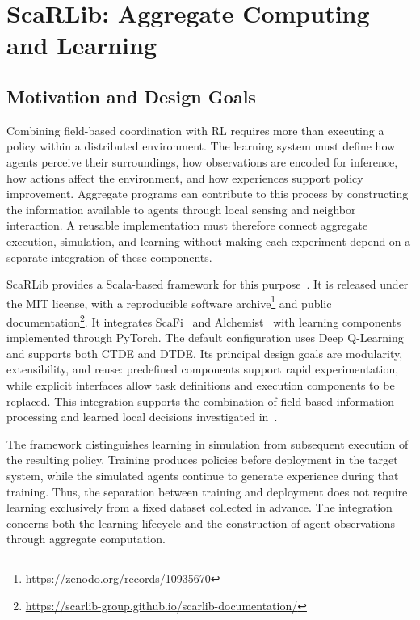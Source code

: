 \section{ScaRLib: Aggregate Computing and Learning}
\label{sec:scarlib}
\label{sec:scarlib-role}

\subsection{Motivation and Design Goals}

Combining field-based coordination with \gls{RL} requires
 more than executing a policy within a distributed environment.
%
The learning system must define how agents perceive their surroundings,
 how observations are encoded for inference, how actions affect the
 environment, and how experiences support policy improvement.
%
Aggregate programs can contribute to this process by constructing the
 information available to agents through local sensing and neighbor
 interaction.
%
A reusable implementation must therefore connect aggregate execution,
 simulation, and learning without making each experiment depend on a
 separate integration of these components.

ScaRLib provides a Scala-based framework for this
 purpose~\cite{DBLP:journals/scp/DominiCAV24}.
%
It is released under the MIT license, with a reproducible
 software archive\footnote{\url{https://zenodo.org/records/10935670}}
 and public documentation\footnote{\url{https://scarlib-group.github.io/scarlib-documentation/}}.
%
It integrates ScaFi~\cite{DBLP:journals/softx/CasadeiVAP22} and
 Alchemist~\cite{DBLP:journals/jos/PianiniMV13} with learning components
 implemented through PyTorch.
%
The default configuration uses Deep Q-Learning and supports 
 both \gls{CTDE} and \gls{DTDE}.
%
Its principal design goals are modularity, extensibility, and reuse:
 predefined components support rapid experimentation, while explicit
 interfaces allow task definitions and execution components to be replaced.
%
This integration supports the combination of field-based information
 processing and learned local decisions investigated
 in~.

The framework distinguishes learning in simulation from subsequent
 execution of the resulting policy.
%
Training produces policies before deployment in the target system, while
 the simulated agents continue to generate experience during that training.
%
Thus, the separation between training and deployment does not require
 learning exclusively from a fixed dataset collected in advance.
%
The integration concerns both the learning lifecycle and the construction
 of agent observations through aggregate computation.


